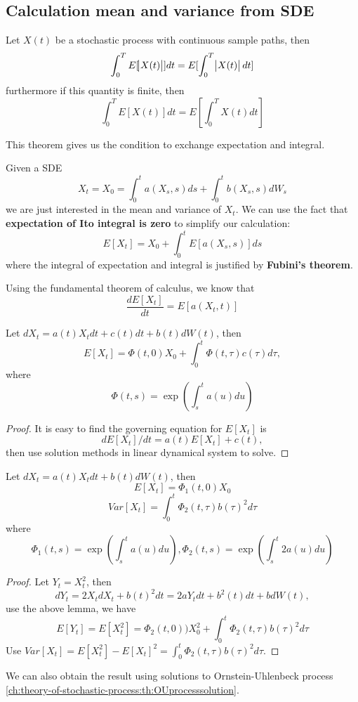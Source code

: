 \begin{refsection}
\subsection{Calculation mean and variance from SDE}
\begin{theorem}
	\cite[53]{klebaner2005introduction}Let $X(t)$ be a stochastic process with continuous sample paths, then
	$$\int_0^T E[\abs{X(t)}]dt = E[\int_0^T\abs{X(t)}dt]$$
	furthermore if this quantity is finite, then
	$$\int_0^T E[X(t)]dt = E[\int_0^T X(t)dt]$$
	
\end{theorem}

\begin{remark}
	This theorem gives us the condition to exchange expectation and integral.
\end{remark}

Given a SDE 
$$X_t = X_0 = \int_0^t a(X_s,s)ds + \int_0^t b(X_s,s)dW_s$$
we are just interested in the mean and variance of $X_t$. We can use the fact that \textbf{expectation of Ito integral is zero} to simplify our calculation:
$$E[X_t] = X_0 + \int_0^tE[a(X_s,s)]ds$$
where the integral of expectation and integral is justified by \textbf{Fubini's theorem}.

Using the fundamental theorem of calculus, we know that $$\frac{d E[X_t]}{dt} = E[a(X_t,t)]$$


\begin{lemma}\cite[142]{calin2012introduction}
	Let $dX_t = a(t)X_t dt + c(t)dt + b(t) dW(t)$, then
	$$E[X_t] = \Phi(t,0)X_0 + \int_0^t \Phi(t,\tau) c(\tau)d\tau,$$
	where $$\Phi(t,s) = \exp(\int_s^t a(u)du)$$
\end{lemma}
\begin{proof}
	It is easy to find the governing equation for $E[X_t]$ is
	$$dE[X_t]/dt = a(t)E[X_t] + c(t),$$ then use solution methods in linear dynamical system to solve. 
\end{proof}



\begin{lemma}\cite[142]{calin2012introduction}
	Let $dX_t = a(t)X_t dt + b(t) dW(t)$, then 
	$$E[X_t] = \Phi_1(t,0) X_0$$
	$$Var[X_t] = \int_0^t \Phi_2(t,\tau) b(\tau)^2d\tau$$
	where $$\Phi_1(t,s) = \exp(\int_s^t a(u)du),\Phi_2(t,s) = \exp(\int_s^t 2a(u)du)$$
\end{lemma}
\begin{proof}
	Let $Y_t = X_t^2$, then $$dY_t = 2X_tdX_t + b(t)^2dt = 2aY_tdt + b^2(t)dt + bdW(t),$$ use the above lemma, we have
	$$E[Y_t]=E[X_t^2] =  \Phi_2(t,0))X_0^2 + \int_0^t \Phi_2(t,\tau) b(\tau)^2d\tau$$
	Use $Var[X_t] = E[X_t^2] - E[X_t]^2 = \int_0^t \Phi_2(t,\tau) b(\tau)^2d\tau$.
\end{proof}
\begin{remark}
	We can also obtain the result using solutions to Ornstein-Uhlenbeck process \autoref{ch:theory-of-stochastic-process:th:OUprocesssolution}. 
\end{remark}




\end{refsection}
